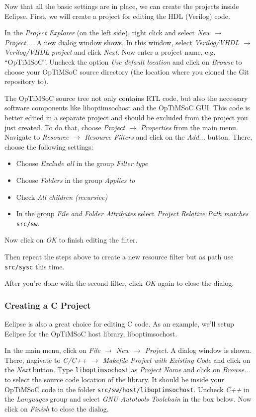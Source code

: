 Now that all the basic settings are in place, we can create the projects inside
Eclipse. First, we will create a project for editing the HDL (Verilog) code.

In the \emph{Project Explorer} (on the left side), right click and select
\emph{New $\rightarrow$ Project...}. A new dialog window shows. In this window,
select \emph{Verilog/VHDL $\rightarrow$ Verilog/VHDL project} and click
\emph{Next}. Now enter a project name, e.g. ``OpTiMSoC''. Uncheck the option
\emph{Use default location} and click on \emph{Browse} to choose your OpTiMSoC
source directory (the location where you cloned the Git repository to).

The OpTiMSoC source tree not only contains RTL code, but also the necessary
software components like liboptimsochost and the OpTiMSoC GUI. This code is
better edited in a separate project and should be excluded from the project you
just created. To do that, choose \emph{Project $\rightarrow$
Properties} from the main menu. Navigate to \emph{Resource $\rightarrow$
Resource Filters} and click on the \emph{Add...} button. There, choose the
following settings:
\begin{itemize}
 \item Choose \emph{Exclude all} in the group \emph{Filter type}
 \item Choose \emph{Folders} in the group \emph{Applies to}
 \item Check \emph{All children (recursive)}
 \item In the group \emph{File and Folder Attributes} select
\emph{Project Relative Path} \emph{matches} \verb|src/sw|.
\end{itemize}
Now click on \emph{OK} to finish editing the filter.

Then repeat the steps above to create a new resource filter but as path
use \verb|src/sysc| this time.

After you're done with the second filter, click \emph{OK} again to
close the dialog.

\subsubsection{Creating a C Project}

Eclipse is also a great choice for editing C code. As an example, we'll setup
Eclipse for the OpTiMSoC host library, liboptimsochost.

In the main menu, click on \emph{File $\rightarrow$ New $\rightarrow$ Project}.
A dialog window is shown. There, nagivate to \emph{C/C++ $\rightarrow$ Makefile
Project with Existing Code} and click on the \emph{Next} button. Type
\verb|liboptimsochost| as \emph{Project Name} and click on \emph{Browse...} to
select the source code location of the library. It should be inside your
OpTiMSoC code in the folder \verb|src/sw/host/liboptimsochost|. Uncheck
\emph{C++} in the \emph{Languages} group and select \emph{GNU Autotools
Toolchain} in the box below. Now click on \emph{Finish} to close the dialog.

